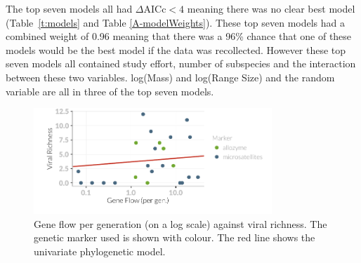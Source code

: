 

The top seven models all had $\Delta\text{AICc} < 4$ meaning there was no clear best model (Table~\ref{t:models} and Table \ref{A-modelWeights}).
These top seven models had a combined weight of 0.96 meaning that there was a 96\% chance that one of these models would be the best model if the data was recollected.
However these top seven models all contained study effort, number of subspecies and the interaction between these two variables.
log(Mass) and log(Range Size) and the random variable are all in three of the top seven models.

\begin{knitrout}\footnotesize
{}\color{fgcolor}\begin{figure}[t]

{\centering \includegraphics[width=0.8\textwidth]{figure/fstRawData-1} 

}

\caption[Gene flow per generation (on a log scale) against viral richness]{Gene flow per generation (on a log scale) against viral richness. The genetic marker used is shown with colour. The red line shows the univariate phylogenetic model.}\label{fig:fstRawData}
\end{figure}


\end{knitrout}

